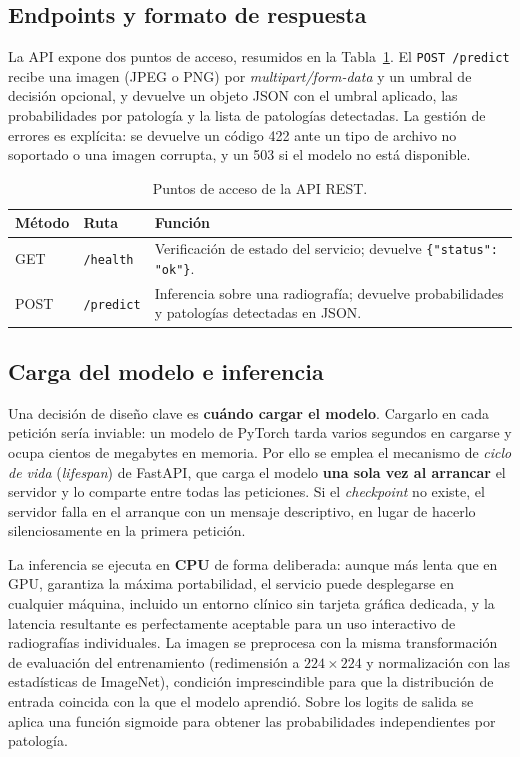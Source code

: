 \subsection{Endpoints y formato de respuesta}

La API expone dos puntos de acceso, resumidos en la Tabla~\ref{tab::endpoints}. El
\texttt{POST /predict} recibe una imagen (JPEG o PNG) por \textit{multipart/form-data}
y un umbral de decisión opcional, y devuelve un objeto JSON con el umbral aplicado,
las probabilidades por patología y la lista de patologías detectadas. La gestión de
errores es explícita: se devuelve un código 422 ante un tipo de archivo no
soportado o una imagen corrupta, y un 503 si el modelo no está disponible.

\begin{table}[h]
\centering
\begin{tabularx}{\textwidth}{l l X}
\toprule
\textbf{Método} & \textbf{Ruta} & \textbf{Función} \\
\midrule
GET & \texttt{/health} & Verificación de estado del servicio; devuelve \texttt{\{"status": "ok"\}}. \\
POST & \texttt{/predict} & Inferencia sobre una radiografía; devuelve probabilidades y patologías detectadas en JSON. \\
\bottomrule
\end{tabularx}
\caption{Puntos de acceso de la API REST.}
\label{tab::endpoints}
\end{table}

\subsection{Carga del modelo e inferencia}

Una decisión de diseño clave es \textbf{cuándo cargar el modelo}. Cargarlo en cada
petición sería inviable: un modelo de PyTorch tarda varios segundos en cargarse y
ocupa cientos de megabytes en memoria. Por ello se emplea el mecanismo de
\textit{ciclo de vida} (\textit{lifespan}) de FastAPI, que carga el modelo
\textbf{una sola vez al arrancar} el servidor y lo comparte entre todas las
peticiones. Si el \textit{checkpoint} no existe, el servidor falla en el arranque
con un mensaje descriptivo, en lugar de hacerlo silenciosamente en la primera
petición.

La inferencia se ejecuta en \textbf{CPU} de forma deliberada: aunque más lenta que
en GPU, garantiza la máxima portabilidad, el servicio puede desplegarse en
cualquier máquina, incluido un entorno clínico sin tarjeta gráfica dedicada, y la
latencia resultante es perfectamente aceptable para un uso interactivo de
radiografías individuales. La imagen se preprocesa con la misma transformación de
evaluación del entrenamiento (redimensión a $224\times224$ y normalización con las
estadísticas de ImageNet), condición imprescindible para que la distribución de
entrada coincida con la que el modelo aprendió. Sobre los logits de salida se
aplica una función sigmoide para obtener las probabilidades independientes por
patología.


